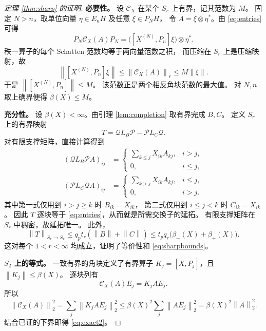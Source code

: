 \documentclass[UTF8,11pt,a4paper,fontset=fandol]{ctexart}
\theoremstyle{remark}
\newcommand{\PP}{\mathcal P}
\newcommand{\QQ}{\mathcal Q}
\newcommand{\CC}{\mathcal C}
\newcommand{\norm}[1]{\left\lVert #1\right\rVert}
\numberwithin{equation}{section}
\begin{document}
\begin{proof}[定理 \ref{thm:sharp} 的证明]
\textbf{必要性。}
设 $\CC_X$ 在某个 $S_r$ 上有界，记其范数为 $M$。
固定 $N>n$，取单位向量 $\eta\in E_nH$ 及任意 $\xi\in P_NH$，
令 $A=\xi\otimes\eta^*$。由 \eqref{eq:entries} 可得
\[
 P_N\CC_X(A)P_N
 =\bigl([X^{(N)},P_n]\xi\bigr)\otimes\eta^*.
\]
秩一算子的每个 Schatten 范数均等于两向量范数之积，
而压缩在 $S_r$ 上是压缩映射，故
\[
 \norm{[X^{(N)},P_n]\xi}
 \leq\norm{\CC_X(A)}_r\leq M\norm\xi.
\]
于是 $\norm{[X^{(N)},P_n]}\leq M$。
该范数正是两个相反角块范数的最大值。
对 $N,n$ 取上确界便得 $\beta(X)\leq M$。

\medskip
\textbf{充分性。}
设 $\beta(X)<\infty$。由引理 \ref{lem:completion} 取有界完成 $B,C$。
定义 $S_r$ 上的有界映射
\begin{equation}\label{eq:factorization}
 T=\QQ L_B\PP-\PP L_C\QQ.
\end{equation}
对有限支撑矩阵，直接计算得到
\begin{align*}
 (\QQ L_B\PP A)_{ij}
 &=\begin{cases}
     \displaystyle\sum_{k\leq j}X_{ik}A_{kj},&i>j,\\
     0,&i\leq j,
   \end{cases}\\
 (\PP L_C\QQ A)_{ij}
 &=\begin{cases}
     \displaystyle\sum_{k>j}X_{ik}A_{kj},&i\leq j,\\
     0,&i>j.
   \end{cases}
\end{align*}
其中第一式仅用到 $i>j\geq k$ 时 $B_{ik}=X_{ik}$，
第二式仅用到 $i\leq j<k$ 时 $C_{ik}=X_{ik}$。
因此 $T$ 逐块等于 \eqref{eq:entries}，从而就是所需交换子的延拓。
有限支撑矩阵在 $S_r$ 中稠密，故延拓唯一。
此外，
\[
 \norm T_{S_r\to S_r}
 \leq q_pt_r(\norm B+\norm C)
 \leq t_pq_r\bigl(\beta_-(X)+\beta_+(X)\bigr).
\]
这对每个 $1<r<\infty$ 均成立，证明了等价性和 \eqref{eq:sharpbounds}。

\medskip
\textbf{$S_2$ 上的等式。}
一致有界的角块定义了有界算子 $K_j=[X,P_j]$，且
$\norm{K_j}\leq\beta(X)$。
逐块列有
\[
 \CC_X(A)E_j=K_jAE_j.
\]
所以
\[
 \norm{\CC_X(A)}_2^2
 =\sum_j\norm{K_jAE_j}_2^2
 \leq\beta(X)^2\sum_j\norm{AE_j}_2^2
 =\beta(X)^2\norm A_2^2.
\]
结合已证的下界即得 \eqref{eq:exact2}。
\end{proof}
\end{document}
